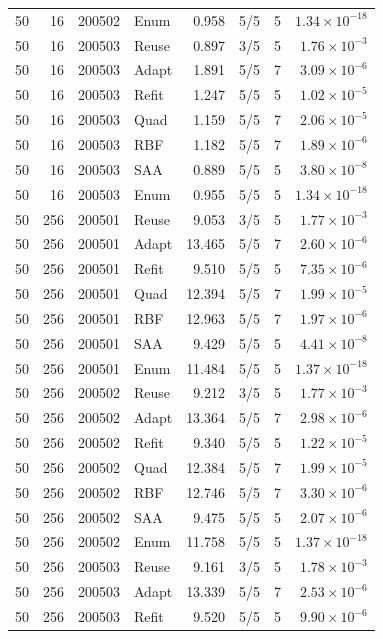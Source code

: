 \begin{longtable}{rrrlrrrr}
50 & 16 & 200502 & Enum & 0.958 & 5/5 & 5 & $1.34\times10^{-18}$\\
50 & 16 & 200503 & Reuse & 0.897 & 3/5 & 5 & $1.76\times10^{-3}$\\
50 & 16 & 200503 & Adapt & 1.891 & 5/5 & 7 & $3.09\times10^{-6}$\\
50 & 16 & 200503 & Refit & 1.247 & 5/5 & 5 & $1.02\times10^{-5}$\\
50 & 16 & 200503 & Quad & 1.159 & 5/5 & 7 & $2.06\times10^{-5}$\\
50 & 16 & 200503 & RBF & 1.182 & 5/5 & 7 & $1.89\times10^{-6}$\\
50 & 16 & 200503 & SAA & 0.889 & 5/5 & 5 & $3.80\times10^{-8}$\\
50 & 16 & 200503 & Enum & 0.955 & 5/5 & 5 & $1.34\times10^{-18}$\\
50 & 256 & 200501 & Reuse & 9.053 & 3/5 & 5 & $1.77\times10^{-3}$\\
50 & 256 & 200501 & Adapt & 13.465 & 5/5 & 7 & $2.60\times10^{-6}$\\
50 & 256 & 200501 & Refit & 9.510 & 5/5 & 5 & $7.35\times10^{-6}$\\
50 & 256 & 200501 & Quad & 12.394 & 5/5 & 7 & $1.99\times10^{-5}$\\
50 & 256 & 200501 & RBF & 12.963 & 5/5 & 7 & $1.97\times10^{-6}$\\
50 & 256 & 200501 & SAA & 9.429 & 5/5 & 5 & $4.41\times10^{-8}$\\
50 & 256 & 200501 & Enum & 11.484 & 5/5 & 5 & $1.37\times10^{-18}$\\
50 & 256 & 200502 & Reuse & 9.212 & 3/5 & 5 & $1.77\times10^{-3}$\\
50 & 256 & 200502 & Adapt & 13.364 & 5/5 & 7 & $2.98\times10^{-6}$\\
50 & 256 & 200502 & Refit & 9.340 & 5/5 & 5 & $1.22\times10^{-5}$\\
50 & 256 & 200502 & Quad & 12.384 & 5/5 & 7 & $1.99\times10^{-5}$\\
50 & 256 & 200502 & RBF & 12.746 & 5/5 & 7 & $3.30\times10^{-6}$\\
50 & 256 & 200502 & SAA & 9.475 & 5/5 & 5 & $2.07\times10^{-6}$\\
50 & 256 & 200502 & Enum & 11.758 & 5/5 & 5 & $1.37\times10^{-18}$\\
50 & 256 & 200503 & Reuse & 9.161 & 3/5 & 5 & $1.78\times10^{-3}$\\
50 & 256 & 200503 & Adapt & 13.339 & 5/5 & 7 & $2.53\times10^{-6}$\\
50 & 256 & 200503 & Refit & 9.520 & 5/5 & 5 & $9.90\times10^{-6}$\\

\end{longtable}

